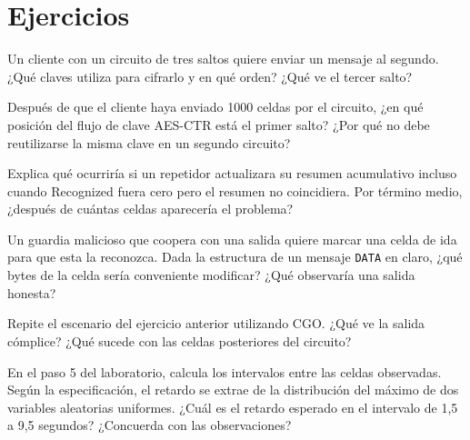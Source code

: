 \section*{Ejercicios}

\begin{esercizio}[1]\label{es:10-ordine}
Un cliente con un circuito de tres saltos quiere enviar un mensaje al segundo. ¿Qué claves utiliza para cifrarlo y en qué orden? ¿Qué ve el tercer salto?
\end{esercizio}

\begin{esercizio}[1]\label{es:10-contatore}
Después de que el cliente haya enviado 1000 celdas por el circuito, ¿en qué posición del flujo de clave AES-CTR está el primer salto? ¿Por qué no debe reutilizarse la misma clave en un segundo circuito?
\end{esercizio}

\begin{esercizio}[2]\label{es:10-falso}
Explica qué ocurriría si un repetidor actualizara su resumen acumulativo incluso cuando Recognized fuera cero pero el resumen no coincidiera. Por término medio, ¿después de cuántas celdas aparecería el problema?
\end{esercizio}

\begin{esercizio}[2]\label{es:10-tag}
Un guardia malicioso que coopera con una salida quiere marcar una celda de ida para que esta la reconozca. Dada la estructura de un mensaje \texttt{DATA} en claro, ¿qué bytes de la celda sería conveniente modificar? ¿Qué observaría una salida honesta?
\end{esercizio}

\begin{esercizio}[2]\label{es:10-cgo-tag}
Repite el escenario del ejercicio anterior utilizando CGO. ¿Qué ve la salida cómplice? ¿Qué sucede con las celdas posteriores del circuito?
\end{esercizio}

\begin{esercizio}[2]\label{es:10-padding}
En el paso 5 del laboratorio, calcula los intervalos entre las celdas  observadas. Según la especificación, el retardo se extrae de la distribución del máximo de dos variables aleatorias uniformes. ¿Cuál es el retardo esperado en el intervalo de 1,5 a 9,5 segundos? ¿Concuerda con las observaciones?
\end{esercizio}

